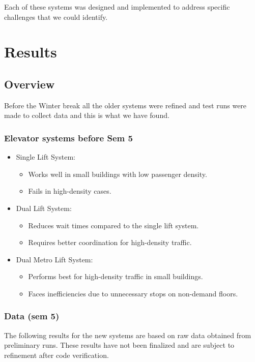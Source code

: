 \documentclass[12pt,a4paper]{report}
\begin{document}
Each of these systems was designed and implemented to address specific challenges that we could identify.

\chapter{Results}
\section{Overview}
Before the Winter break all the older systems were refined and test runs were made to collect data and this is what we have found.
\subsection{Elevator systems before Sem 5}
\begin{itemize}
    \item Single Lift System:
    \begin{itemize}
        \item Works well in small buildings with low passenger density.
        \item Fails in high-density cases.
    \end{itemize}
    \item Dual Lift System:
    \begin{itemize}
        \item Reduces wait times compared to the single lift system.
        \item Requires better coordination for high-density traffic.
    \end{itemize}
    \item Dual Metro Lift System:
    \begin{itemize}
        \item Performs best for high-density traffic in small buildings.
        \item Faces inefficiencies due to unnecessary stops on non-demand floors.
    \end{itemize}
\end{itemize}

\subsection{Data (sem 5)}
The following results for the new systems are based on raw data obtained from preliminary runs. These results have not been finalized and are subject to refinement after code verification.
\end{document}
